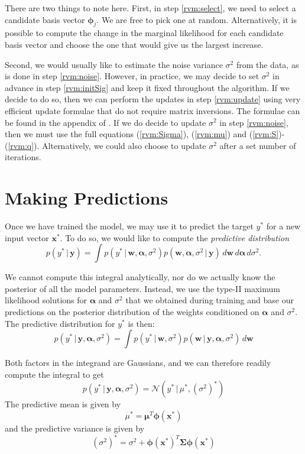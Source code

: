 There are two things to note here. 
First, in step \ref{rvm:select}, we need to select a candidate basis vector $\bm\phi_j$. 
We are free to pick one at random. 
Alternatively, it is possible to compute the change in the marginal likelihood for each candidate basis vector and choose the one that would give us the largest increase.

Second, we would usually like to estimate the noise variance $\sigma^2$ from the data, as is done in step \ref{rvm:noise}.
However, in practice, we may decide to set $\sigma^2$ in advance in step \ref{rvm:initSig} and keep it fixed throughout the algorithm.
If we decide to do so, then we can perform the updates in step \ref{rvm:update} using very efficient update formulae that do not require matrix inversions.
The formulae can be found in the appendix of \cite{tipping2003}.
If we do decide to update $\sigma^2$ in step \ref{rvm:noise}, then we must use the full equations (\ref{rvm:Sigma}), (\ref{rvm:mu}) and (\ref{rvm:S})-(\ref{rvm:q}).
Alternatively, we could also choose to update $\sigma^2$ after a set number of iterations.

\section{Making Predictions}
Once we have trained the model, we may use it to predict the target $y^*$ for a new input vector $\bm x^*$.
To do so, we would like to compute the \emph{predictive distribution}
\begin{equation*}
  p(y^*\,|\,\bm y) = \int p(y^*\,|\,\bm w, \bm\alpha,\sigma^2) p(\bm w,\bm\alpha,\sigma^2\,|\,\bm y)\,d\bm w \,d\bm\alpha \,d\sigma^2.
\end{equation*}

We cannot compute this integral analytically, nor do we actually know the posterior of all the model parameters.
Instead, we use the type-II maximum likelihood solutions for $\bm\alpha$ and $\sigma^2$ that we obtained during training and base our predictions on the posterior distribution of the weights conditioned on $\bm\alpha$ and $\sigma^2$. 
The predictive distribution for $y^*$ is then:
\begin{equation}
  \label{rvm:predictive}
  p(y^*\,|\,\bm y,\bm\alpha, \sigma^2) = \int p(y^*\,|\,\bm w, \sigma^2) p(\bm w\,|\,\bm y,\bm\alpha,\sigma^2)\,d\bm w
\end{equation}

Both factors in the integrand are Gaussians, and we can therefore readily compute the integral to get
\begin{equation}
  p(y^*\,|\,\bm y, \bm\alpha,\sigma^2) = \mathcal{N}(y^*\,|\,\mu^*,(\sigma^2)^*)
\end{equation}
The predictive mean is given by
\begin{equation}
  \label{rvm:pred_mean}
  \mu^* = \bm\mu^T\bm\phi(\bm x^*)
\end{equation}
and the predictive variance is given by
\begin{equation}
  \label{rvm:pred_var}
  (\sigma^2)^* = \sigma^2 + \bm\phi(\bm x^*)^T\bm\Sigma\bm\phi(\bm x^*)
\end{equation}

